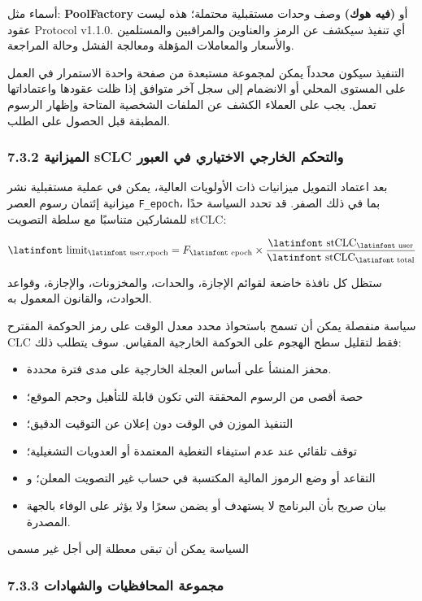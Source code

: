 \documentclass[11pt]{article}
\begin{document}
أسماء مثل: \textbf{PoolFactory} أو \textbf{(فيه هوك)} وصف وحدات مستقبلية محتملة؛ هذه ليست عقود Protocol v1.1.0. أي تنفيذ سيكشف عن الرمز والعناوين والمراقبين والمستلمين والأسعار والمعاملات المؤهلة ومعالجة الفشل وحالة المراجعة.

التنفيذ سيكون محدداً يمكن لمجموعة مستبعدة من صفحة واحدة الاستمرار في العمل على المستوى المحلي أو الانضمام إلى سجل آخر متوافق إذا ظلت عقودها واعتماداتها تعمل. يجب على العملاء الكشف عن الملفات الشخصية المتاحة وإظهار الرسوم المطبقة قبل الحصول على الطلب.

\subsubsection*{7.3.2 الميزانية sCLC والتحكم الخارجي الاختياري في العبور}

بعد اعتماد التمويل ميزانيات ذات الأولويات العالية، يمكن في عملية مستقبلية نشر ميزانية إئتمان رسوم العصر \texttt{F\_epoch}، بما في ذلك الصفر. قد تحدد السياسة حدًا للمشاركين متناسبًا مع سلطة التصويت stCLC:

\[
\text{\latinfont limit}_{\text{\latinfont user,epoch}} = F_{\text{\latinfont epoch}} \times \frac{\text{\latinfont stCLC}_{\text{\latinfont user}}}{\text{\latinfont stCLC}_{\text{\latinfont total}}}
\]

ستظل كل نافذة خاضعة لقوائم الإجازة، والحدات، والمخزونات، والإجازة، وقواعد الحوادث، والقانون المعمول به.

سياسة منفصلة يمكن أن تسمح باستحواذ محدد معدل الوقت على رمز الحوكمة المقترح CLC فقط لتقليل سطح الهجوم على الحوكمة الخارجية المقياس. سوف يتطلب ذلك:

\begin{itemize}[leftmargin=*]
\item محفز المنشأ على أساس العجلة الخارجية على مدى فترة محددة.
\item حصة أقصى من الرسوم المحققة التي تكون قابلة للتأهيل وحجم الموقع؛
\item التنفيذ الموزن في الوقت دون إعلان عن التوقيت الدقيق؛
\item توقف تلقائي عند عدم استيفاء التغطية المعتمدة أو العدويات التشغيلية؛
\item التقاعد أو وضع الرموز المالية المكتسبة في حساب غير التصويت المعلن؛ و
\item بيان صريح بأن البرنامج لا يستهدف أو يضمن سعرًا ولا يؤثر على الوفاء بالجهة المصدرة.
\end{itemize}
السياسة يمكن أن تبقى معطلة إلى أجل غير مسمى

\subsubsection*{7.3.3 مجموعة المحافظيات والشهادات}
\end{document}
